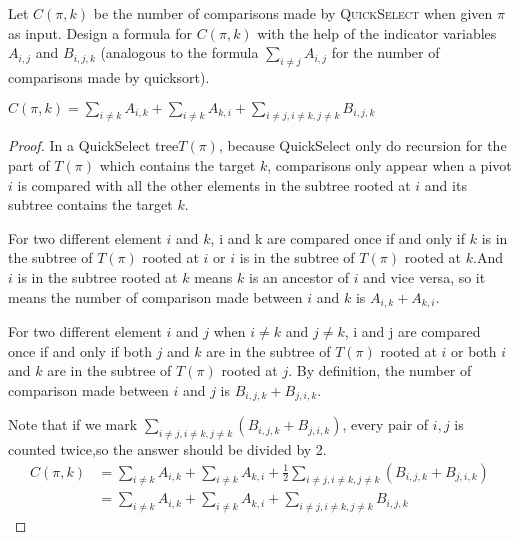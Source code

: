 \documentclass[11pt,a4paper,oneside]{article}
\begin{document}
\begin{problem}{7}
\statement
Let $C(\pi,k)$ be the number of comparisons made by \textsc{QuickSelect} when given
$\pi$ as input. Design a formula for $C(\pi,k)$ with the help of the indicator
variables $A_{i,j}$ and $B_{i,j,k}$ (analogous to the formula 
$\sum_{i \ne j} A_{i,j}$ for the number of comparisons made by quicksort).

\solution
\begin{lemma}
$C(\pi,k)=\sum_{i \ne k} A_{i,k}+\sum_{i \ne k} A_{k,i}+\sum_{i \ne j,i \ne k,j\ne k} B_{i,j,k}$
\end{lemma}
\begin{proof}
In a QuickSelect tree$T(\pi)$, because QuickSelect only do recursion for the part of $T(\pi)$ which contains the target $k$, 
comparisons only appear when a pivot $i$ is compared with all the other elements in the subtree rooted at $i$ and its subtree contains the target $k$. 

For two different element $i$ and $k$, i and k are compared once if and only if $k$ is in the subtree of $T(\pi)$ rooted at $i$ or $i$ is in the subtree of $T(\pi)$ rooted at $k$.And $i$ is in the subtree rooted at $k$ means $k$ is an ancestor of $i$ and vice versa, so it means the number of comparison made between $i$ and $k$ is $A_{i,k}+A_{k,i}$.

For two different element $i$ and $j$ when $i\ne k$ and $j\ne k$, i and j are compared once if and only if both $j$ and $k$ are in the subtree of $T(\pi)$ rooted at $i$ or both $i$ and $k$ are in the subtree of $T(\pi)$ rooted at $j$. By definition, the number of comparison made between $i$ and $j$ is $B_{i,j,k}+B_{j,i,k}$.

Note that if we mark $\sum_{i \ne j,i \ne k,j\ne k} (B_{i,j,k}+B_{j,i,k})$, every pair of $i,j$ is counted twice,so the answer should be divided by 2.
    \[
        \begin{split}
            C(\pi,k) &= \sum_{i \ne k} A_{i,k}+\sum_{i \ne k} A_{k,i}+\frac{1}{2}\sum_{i \ne j,i \ne k,j\ne k}(B_{i,j,k}+B_{j,i,k})\\
			&= \sum_{i \ne k} A_{i,k}+\sum_{i \ne k} A_{k,i}+\sum_{i \ne j,i \ne k,j\ne k} B_{i,j,k}
        \end{split}
    \]
\end{proof}
\end{problem}
\end{document}
